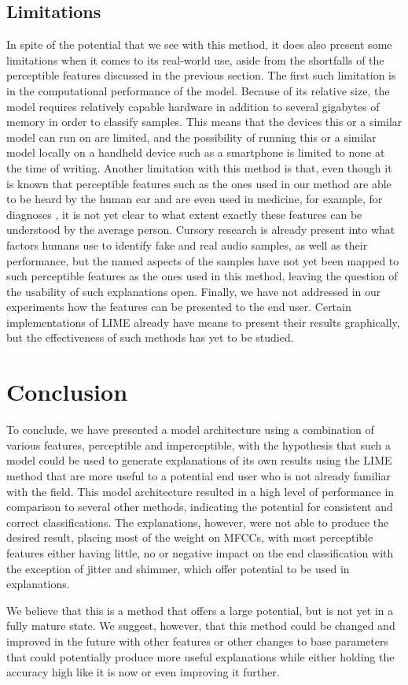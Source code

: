 \documentclass{article}
\begin{document}
		\subsection{Limitations}
		In spite of the potential that we see with this method, it does also present some
		limitations when it comes to its real-world use, aside from the shortfalls of the
		perceptible features discussed in the previous section. The first such limitation is in
		the computational performance of the model. Because of its relative size, the model
		requires relatively capable hardware in addition to several gigabytes of memory in order
		to classify samples. This means that the devices this or a similar model can run on are
		limited, and the possibility of running this or a similar model locally on a handheld
		device such as a smartphone is limited to none at the time of writing. Another limitation
		with this method is that, even though it is known that perceptible features such as the
		ones used in our method are able to be heard by the human ear and are even used in
		medicine, for example, for diagnoses \cite{chaiwongyen_deepfake-speech_2023}, it is not
		yet clear to what extent exactly these features can be understood by the average person.
		Cursory research \cite{sharevski_blind_2024} is already present into what factors humans
		use to identify fake and real audio samples, as well as their performance, but the named
		aspects of the samples have not yet been mapped to such perceptible features as the ones
		used in this method, leaving the question of the usability of such explanations open.
		Finally, we have not addressed in our experiments how the features can be presented to the
		end user. Certain implementations of LIME already have means to present their results
		graphically, but the effectiveness of such methods has yet to be studied.
	\section{Conclusion}
	To conclude, we have presented a model architecture using a combination of various features,
	perceptible and imperceptible, with the hypothesis that such a model could be used to generate
	explanations of its own results using the LIME method that are more useful to a potential end
	user who is not already familiar with the field. This model architecture resulted in a high
	level of performance in comparison to several other methods, indicating the potential for
	consistent and correct classifications. The explanations, however, were not able to produce
	the desired result, placing most of the weight on MFCCs, with most perceptible features either
	having little, no or negative impact on the end classification with the exception of jitter
	and shimmer, which offer potential to be used in explanations.
	\par
	We believe that this is a method that offers a large potential, but is not yet in a fully
	mature state. We suggest, however, that this method could be changed and improved in the
	future with other features or other changes to base parameters that could potentially produce
	more useful explanations while either holding the accuracy high like it is now or even
	improving it further.
	\newpage
	\sloppy
	\printbibliography
\end{document}
